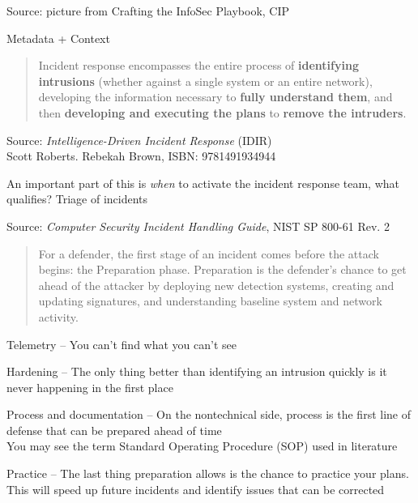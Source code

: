\documentclass[Screen16to9,17pt]{foils}
\begin{document}
Source: picture from Crafting the InfoSec Playbook, CIP

Metadata + Context








\begin{quote}
Incident response encompasses the entire process of {\bf identifying intrusions} (whether against a single system or an entire network), developing the information necessary to {\bf fully understand them}, and then {\bf developing and executing the plans} to {\bf remove the intruders}.
\end{quote}
Source: \emph{Intelligence-Driven Incident Response} (IDIR)\\
 Scott Roberts. Rebekah Brown, ISBN: 9781491934944


\begin{list2}
\item An important part of this is \emph{when} to activate the incident response team, what qualifies? Triage of incidents
\end{list2}



Source: \emph{Computer Security Incident Handling Guide}, NIST SP 800-61 Rev. 2






\begin{quote}
For a defender, the first stage of an incident comes before the attack begins: the Preparation phase. Preparation is the defender’s chance to get ahead of the attacker by deploying new detection systems, creating and updating signatures, and understanding baseline system and network activity.
\end{quote}

\begin{list2}
\item Telemetry -- You can’t find what you can’t see
\item Hardening -- The only thing better than identifying an intrusion quickly is it never happening in the first place
\item Process and documentation -- On the nontechnical side, process is the first line of defense that can be prepared ahead of time\\
You may see the term Standard Operating Procedure (SOP) used in literature
\item Practice -- The last thing preparation allows is the chance to practice your plans. This will speed up future incidents and identify issues that can be corrected
\end{list2}
\end{document}
